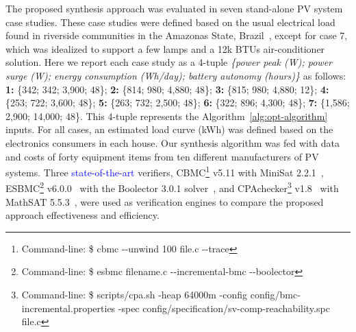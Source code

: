 \documentclass[runningheads]{llncs}
\begin{document}
The proposed synthesis approach was evaluated in seven stand-alone PV system case studies.
These case studies were defined based on the usual electrical load found in riverside communities in the Amazonas State, Brazil~\cite{TrindadeCordeiro19,Agrener2013}, except for case 7, which was idealized to support a few lamps and a 12k BTUs air-conditioner solution. 
Here we report each case study as a 4-tuple \textit{\{power peak (W); power surge (W); energy consumption (Wh/day); battery autonomy (hours)\}} as follows:
\textbf{1:} \{342; 342; 3,900; 48\}; \textbf{2:} \{814; 980; 4,880; 48\}; \textbf{3:} \{815; 980; 4,880; 12\}; \textbf{4:} \{253; 722; 3,600; 48\}; \textbf{5:} \{263; 732; 2,500; 48\}; \textbf{6:} \{322; 896; 4,300; 48\}; \textbf{7:} \{1,586; 2,900; 14,000; 48\}. This 4-tuple represents the Algorithm~\ref{alg:opt-algorithm} inputs. For all cases, an estimated load curve (kWh) was defined based on the electronics consumers in each house. Our synthesis algorithm was fed with data and costs of forty equipment items from ten different manufacturers of PV systems. 
%
Three \textcolor{blue}{state-of-the-art} verifiers, CBMC\footnote{Command-line: \$ cbmc -\phantom{}-unwind 100 file.c -\phantom{}-trace} v5.11 with MiniSat 2.2.1~\cite{Kroening}, ESBMC\footnote{Command-line: \$ esbmc filename.c -\phantom{}-incremental-bmc -\phantom{}-boolector} v6.0.0~\cite{esbmc2018} with the Boolector 3.0.1 solver~\cite{Brummayer}, and CPAchecker\footnote{Command-line: \$ scripts/cpa.sh -heap 64000m -config config/bmc-incremental.properties -spec config/specification/sv-comp-reachability.spc file.c} v1.8~\cite{Beyer2011} with MathSAT 5.5.3~\cite{mathsat5}, were used as verification engines to compare the proposed approach effectiveness and efficiency. 

\end{document}
